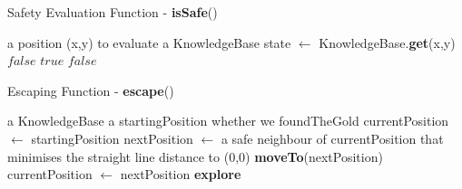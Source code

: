 \documentclass[11pt,a4paper]{article}
\begin{document}
\newpage

\begin{algorithm}
\caption{Safety Evaluation Function - \textbf{isSafe}()}
\label{isSafe}
\begin{algorithmic}[1]
\REQUIRE a position (x,y) to evaluate
\REQUIRE a KnowledgeBase
\STATE state $\leftarrow$ KnowledgeBase.\textbf{get}(x,y)
\RETURN $false$
\ENDIF
{}
\RETURN $true$
\ELSE
\RETURN $false$
\ENDIF
\end{algorithmic}
\end{algorithm}

\begin{algorithm}
\caption{Escaping Function - \textbf{escape}()}
\label{escape}
\begin{algorithmic}[1]
\REQUIRE a KnowledgeBase
\REQUIRE a startingPosition
\REQUIRE whether we foundTheGold
\STATE currentPosition $\leftarrow$ startingPosition
\REPEAT
\STATE nextPosition $\leftarrow$ a safe neighbour of currentPosition that minimises the straight line distance to (0,0)
\STATE \textbf{moveTo}(nextPosition)
\STATE currentPosition $\leftarrow$ nextPosition
\STATE \textbf{explore}
\ENDIF
\end{algorithmic}
\end{algorithm}
\end{document}

